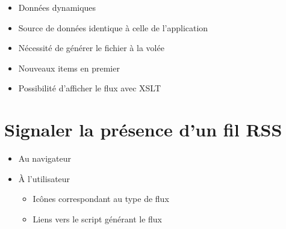 \begin{itemize}
\tightlist
\item
  Données dynamiques
\item
  Source de données identique à celle de l'application
\item
  Nécessité de générer le fichier à la volée
\item
  Nouveaux items en premier
\item
  Possibilité d'afficher le flux avec XSLT
\end{itemize}

\hypertarget{signaler-la-pruxe9sence-dun-fil-rss}{%
\section{Signaler la présence d'un fil
RSS}\label{signaler-la-pruxe9sence-dun-fil-rss}}

\begin{itemize}
\tightlist
\item
  Au navigateur
\end{itemize}

\begin{otherlanguage}{english}

\begin{Shaded}
\begin{Highlighting}[]
\KeywordTok{>}
\end{Highlighting}
\end{Shaded}

\end{otherlanguage}

\begin{itemize}
\tightlist
\item
  À l'utilisateur

  \begin{itemize}
  \tightlist
  \item
    Icônes correspondant au type de flux
  \item
    Liens vers le script générant le flux
  \end{itemize}
\end{itemize}

\begin{otherlanguage}{english}

\begin{Shaded}
\begin{Highlighting}[]
\KeywordTok{>}
  
\end{Highlighting}
\end{Shaded}

\end{otherlanguage}

